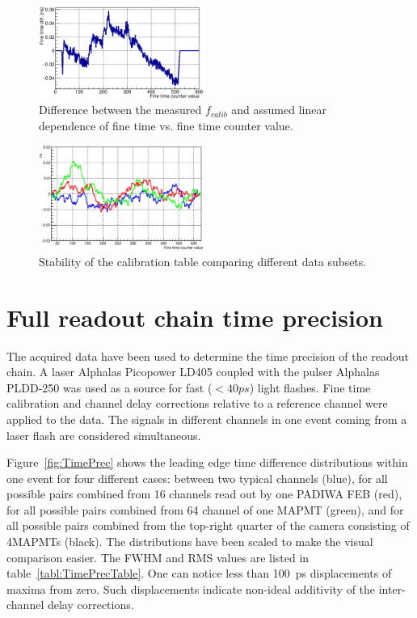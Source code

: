 \documentclass[final,5p,times,twocolumn]{elsarticle}
\begin{document}
\begin{figure}[tbh]
	\centering
	\includegraphics[width=0.48\textwidth]{figures/CalTableMinusFit_0010_01_feb2017.eps}
	\caption{Difference between the measured $ f_{calib} $ and assumed linear dependence of fine time vs. fine time counter value.}
	\label{fig:CalibTableMinusLinear}
\end{figure}

\begin{figure}[tbh]
	\centering
	\includegraphics[width=0.48\textwidth]{figures/Stability_01_diff.eps}
	\caption{Stability of the calibration table comparing different data subsets.}
	\label{fig:CalibStability}
\end{figure}

\section{Full readout chain time precision}

The acquired data have been used to determine the time precision of the readout chain. A laser Alphalas Picopower LD405 coupled with the pulser Alphalas PLDD-250 \cite{LASER} was used as a source for fast ($<40ps$) light flashes. Fine time calibration and channel delay corrections relative to a reference channel were applied to the data. The signals in different channels in one event coming from a laser flash are considered simultaneous.

Figure~\ref{fig:TimePrec} shows the leading edge time difference distributions within one event for four different cases:
between two typical channels (blue), for all possible pairs combined from 16 channels read out by one PADIWA FEB (red), for all possible pairs combined from 64 channel of one MAPMT (green), and  for all possible pairs combined from the top-right quarter of the camera consisting of 4MAPMTs (black).
The distributions have been scaled to make the visual comparison easier. The FWHM and RMS values are listed in table~\ref{tabl:TimePrecTable}.
One can notice less than 100~ps displacements of maxima from zero. Such displacements indicate non-ideal additivity of the inter-channel delay corrections.
\end{document}
